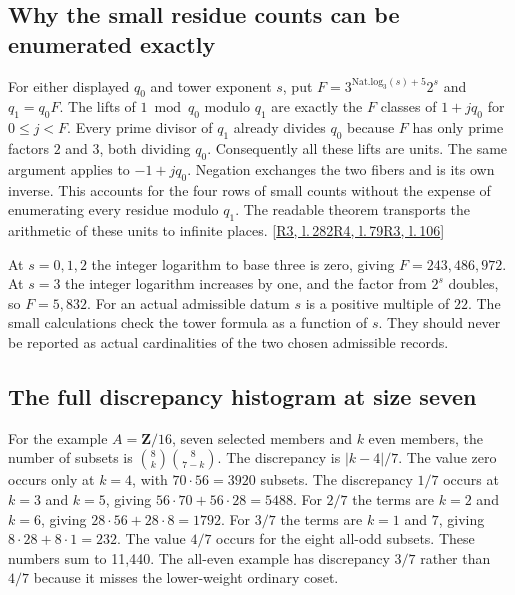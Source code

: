 \documentclass[12pt,letterpaper]{article}
\begin{document}
\subsection{Why the small residue counts can be enumerated exactly}
For either displayed $q_0$ and tower exponent $s$, put $F=3^{\mathrm{Nat.log}_3(s)+5}2^s$ and $q_1=q_0F$. The lifts of $1\bmod q_0$ modulo $q_1$ are exactly the $F$ classes of $1+jq_0$ for $0\le j<F$. Every prime divisor of $q_1$ already divides $q_0$ because $F$ has only prime factors $2$ and $3$, both dividing $q_0$. Consequently all these lifts are units. The same argument applies to $-1+jq_0$. Negation exchanges the two fibers and is its own inverse. This accounts for the four rows of small counts without the expense of enumerating every residue modulo $q_1$. The readable theorem transports the arithmetic of these units to infinite places.  {\footnotesize\sffamily\color{mute}[\href{https://github.com/leanprover-community/riemann-hypothesis/blob/e063a923620ee7787b4a1270421478645bf66bdb/src/New/Reduction/Data/FieldsAndPlaces.lean\#L282}{R3, l.\,282}\enspace \href{https://github.com/leanprover-community/riemann-hypothesis/blob/e063a923620ee7787b4a1270421478645bf66bdb/src/New/Reduction/PrimeSums.lean\#L79}{R4, l.\,79}\enspace \href{https://github.com/leanprover-community/riemann-hypothesis/blob/e063a923620ee7787b4a1270421478645bf66bdb/src/New/Reduction/Data/FieldsAndPlaces.lean\#L106}{R3, l.\,106}]}

At $s=0,1,2$ the integer logarithm to base three is zero, giving $F=243,486,972$. At $s=3$ the integer logarithm increases by one, and the factor from $2^s$ doubles, so $F=5{,}832$. For an actual admissible datum $s$ is a positive multiple of $22$. The small calculations check the tower formula as a function of $s$. They should never be reported as actual cardinalities of the two chosen admissible records.

\subsection{The full discrepancy histogram at size seven}
For the example $A=\mathbf Z/16$, seven selected members and $k$ even members, the number of subsets is $\binom8k\binom8{7-k}$. The discrepancy is $|k-4|/7$. The value zero occurs only at $k=4$, with $70\cdot56=3920$ subsets. The discrepancy $1/7$ occurs at $k=3$ and $k=5$, giving $56\cdot70+56\cdot28=5488$. For $2/7$ the terms are $k=2$ and $k=6$, giving $28\cdot56+28\cdot8=1792$. For $3/7$ the terms are $k=1$ and $7$, giving $8\cdot28+8\cdot1=232$. The value $4/7$ occurs for the eight all-odd subsets. These numbers sum to 11,440. The all-even example has discrepancy $3/7$ rather than $4/7$ because it misses the lower-weight ordinary coset.
\end{document}
